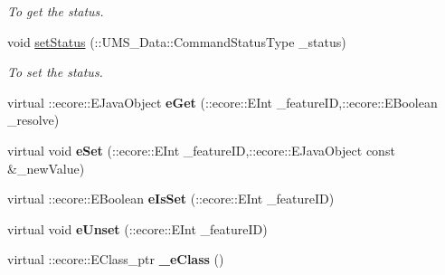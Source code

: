 \begin{DoxyCompactItemize}
\begin{DoxyCompactList}\small\item\em To get the status. \item\end{DoxyCompactList}\item 
void \hyperlink{classUMS__Data_1_1Command_a076d0296621fbea38cf9fb50663e28fc}{setStatus} (::UMS\_\-Data::CommandStatusType \_\-status)
\begin{DoxyCompactList}\small\item\em To set the status. \item\end{DoxyCompactList}\item 
\hypertarget{classUMS__Data_1_1Command_a07a8cb4e04bb1257bd15d87e2ab3a278}{
virtual ::ecore::EJavaObject {\bfseries eGet} (::ecore::EInt \_\-featureID,::ecore::EBoolean \_\-resolve)}
\label{classUMS__Data_1_1Command_a07a8cb4e04bb1257bd15d87e2ab3a278}

\item 
\hypertarget{classUMS__Data_1_1Command_a383fa0384266578fbf4592d4005c466c}{
virtual void {\bfseries eSet} (::ecore::EInt \_\-featureID,::ecore::EJavaObject const \&\_\-newValue)}
\label{classUMS__Data_1_1Command_a383fa0384266578fbf4592d4005c466c}

\item 
\hypertarget{classUMS__Data_1_1Command_a13fadd120957e897612a66f335410a1c}{
virtual ::ecore::EBoolean {\bfseries eIsSet} (::ecore::EInt \_\-featureID)}
\label{classUMS__Data_1_1Command_a13fadd120957e897612a66f335410a1c}

\item 
\hypertarget{classUMS__Data_1_1Command_a9b70f55b5cbdc650488ba20577e50faf}{
virtual void {\bfseries eUnset} (::ecore::EInt \_\-featureID)}
\label{classUMS__Data_1_1Command_a9b70f55b5cbdc650488ba20577e50faf}

\item 
\hypertarget{classUMS__Data_1_1Command_aa7caabcfc7bf715337f2a2435258bcd7}{
virtual ::ecore::EClass\_\-ptr {\bfseries \_\-eClass} ()}
\label{classUMS__Data_1_1Command_aa7caabcfc7bf715337f2a2435258bcd7}

\end{DoxyCompactItemize}

